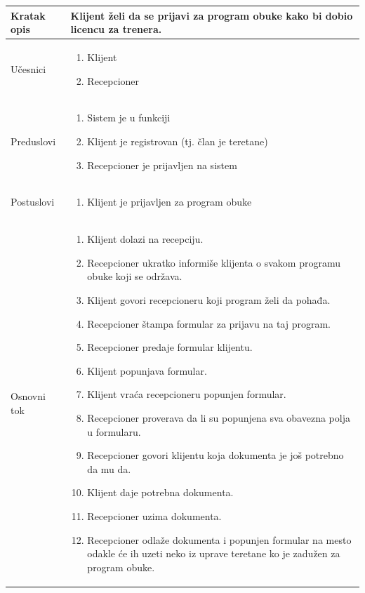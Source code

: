 \documentclass[../../main.tex]{subfiles}
\begin{document}
\begin{longtable}{| p{} | p{} |} 
\hline
    Kratak opis & Klijent želi da se prijavi za program obuke kako bi dobio licencu za trenera.  \\ 
\hline    
    Učesnici &
    \begin{enumerate}
        \item Klijent
        \item Recepcioner
    \end{enumerate}\\
\hline
   Preduslovi &
   \begin{enumerate}
        \item Sistem je u funkciji
        \item Klijent je registrovan (tj. član je teretane)
        \item Recepcioner je prijavljen na sistem
    \end{enumerate}\\
\hline  
    Postuslovi & 
    \begin{enumerate}
        \item Klijent je prijavljen za program obuke
    \end{enumerate} \\
\hline
    Osnovni tok & 
    \begin{enumerate}
        \item Klijent dolazi na recepciju.
        \item Recepcioner ukratko informiše klijenta o svakom programu obuke koji se održava.
        \item Klijent govori recepcioneru koji program želi da pohađa.
        \item Recepcioner štampa formular za prijavu na taj program.
        \item Recepcioner predaje formular klijentu.
        \item Klijent popunjava formular.
        \item Klijent vraća recepcioneru popunjen formular.
        \item Recepcioner proverava da li su popunjena sva obavezna polja u formularu.
        \item Recepcioner govori klijentu koja dokumenta je još potrebno da mu da.
        \item Klijent daje potrebna dokumenta.
        \item Recepcioner uzima dokumenta.
        \item Recepcioner odlaže dokumenta i popunjen formular na mesto odakle će ih uzeti neko iz uprave teretane ko je zadužen za program obuke.

\end{enumerate}
\end{longtable}
\end{document}
